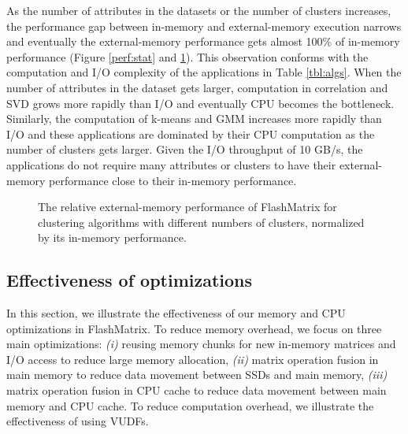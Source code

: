 As the number of attributes in the datasets or the number of clusters increases,
the performance gap between in-memory and external-memory execution
narrows and eventually the external-memory performance gets almost 100\%
of in-memory performance (Figure \ref{perf:stat} and \ref{perf:clust}).
This observation conforms with the computation and I/O complexity of
the applications in Table \ref{tbl:algs}. When the number of attributes
in the dataset gets larger, computation in correlation and SVD grows more
rapidly than I/O and eventually CPU becomes the bottleneck. Similarly,
the computation of k-means and GMM increases more rapidly than I/O and
these applications are dominated by their CPU computation as the number
of clusters gets larger. Given the I/O throughput of 10 GB/s, the applications
do not require many attributes or clusters to have their external-memory
performance close to their in-memory performance.

\begin{figure}
	\begin{center}
		\footnotesize
		\vspace{-15pt}
		
		\vspace{-10pt}
		\caption{The relative external-memory performance of FlashMatrix for
			clustering algorithms with different numbers of clusters, normalized
		by its in-memory performance.}
		\label{perf:clust}
	\end{center}
\end{figure}

\subsection{Effectiveness of optimizations}

In this section, we illustrate the effectiveness of our memory and CPU
optimizations in FlashMatrix. To reduce memory overhead, we focus on three
main optimizations: \textit{(i)} reusing memory chunks for new in-memory
matrices and I/O access to reduce large
memory allocation, \textit{(ii)} matrix operation fusion in main
memory to reduce data movement between SSDs and main memory, \textit{(iii)}
matrix operation fusion in CPU cache to reduce data movement between main
memory and CPU cache. To reduce computation overhead, we illustrate
the effectiveness of using VUDFs.

